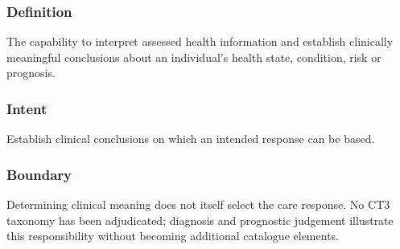 \subsubsection*{Definition}

The capability to interpret assessed health information and establish clinically meaningful conclusions about an individual's health state, condition, risk or prognosis.

\subsubsection*{Intent}

Establish clinical conclusions on which an intended response can be based.

\subsubsection*{Boundary}

Determining clinical meaning does not itself select the care response. No CT3 taxonomy has been adjudicated; diagnosis and prognostic judgement illustrate this responsibility without becoming additional catalogue elements.

